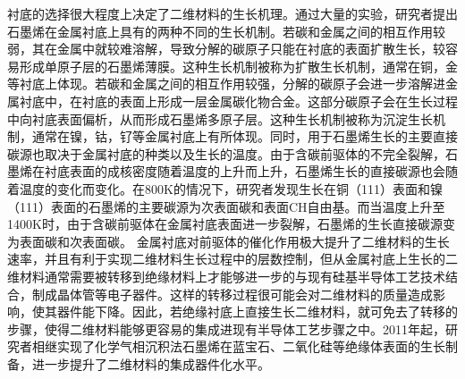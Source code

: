 衬底的选择很大程度上决定了二维材料的生长机理。通过大量的实验，研究者提出石墨烯在金属衬底上具有的两种不同的生长机制。若碳和金属之间的相互作用较弱，其在金属中就较难溶解，导致分解的碳原子只能在衬底的表面扩散生长，较容易形成单原子层的石墨烯薄膜。这种生长机制被称为扩散生长机制，通常在铜，金等衬底上体现。若碳和金属之间的相互作用较强，分解的碳原子会进一步溶解进金属衬底中，在衬底的表面上形成一层金属碳化物合金。这部分碳原子会在生长过程中向衬底表面偏析，从而形成石墨烯多原子层。这种生长机制被称为沉淀生长机制，通常在镍，钴，钌等金属衬底上有所体现。同时，用于石墨烯生长的主要直接碳源也取决于金属衬底的种类以及生长的温度。由于含碳前驱体的不完全裂解，石墨烯在衬底表面的成核密度随着温度的上升而上升，石墨烯生长的直接碳源也会随着温度的变化而变化。在800K的情况下，研究者发现生长在铜（111）表面和镍（111）表面的石墨烯的主要碳源为次表面碳和表面CH自由基。而当温度上升至1400K时，由于含碳前驱体在金属衬底表面进一步裂解，石墨烯的生长直接碳源变为表面碳和次表面碳。
金属衬底对前驱体的催化作用极大提升了二维材料的生长速率，并且有利于实现二维材料生长过程中的层数控制，但从金属衬底上生长的二维材料通常需要被转移到绝缘材料上才能够进一步的与现有硅基半导体工艺技术结合，制成晶体管等电子器件。这样的转移过程很可能会对二维材料的质量造成影响，使其器件能下降。因此，若绝缘衬底上直接生长二维材料，就可免去了转移的步骤，使得二维材料能够更容易的集成进现有半导体工艺步骤之中。2011年起，研究者相继实现了化学气相沉积法石墨烯在蓝宝石、二氧化硅等绝缘体表面的生长制备，进一步提升了二维材料的集成器件化水平。

